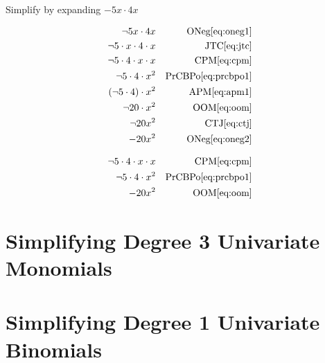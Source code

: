 \documentclass[20150903-160354-rs2.2-MarksMathNotebook.tex]{subfiles}
\begin{document}
\begin{example}[id:20141108-191616] \label{20141108-191616}  \hfill \\

Simplify by expanding $-5x \cdot 4x$

\soln

\solnsteps
\begin{align*}
\neg 5x \cdot 4x && \text{ONeg} \eqref{eq:oneg1} \\
\neg 5 \cdot x \cdot 4 \cdot x && \text{JTC} \eqref{eq:jtc} \\
\neg 5 \cdot 4 \cdot x \cdot x && \text{CPM} \eqref{eq:cpm} \\
\neg 5 \cdot 4 \cdot x^2 && \text{PrCBPo} \eqref{eq:prcbpo1} \\
(\neg 5 \cdot 4) \cdot x^2 && \text{APM} \eqref{eq:apm1} \\
\neg 20 \cdot x^2 && \text{OOM} \eqref{eq:oom} \\
\neg 20 x^2 && \text{CTJ} \eqref{eq:ctj} \\
-20x^2 && \text{ONeg} \eqref{eq:oneg2}
\end{align*}

\soln

\lesssteps
\begin{align*}
\neg 5 \cdot 4 \cdot x \cdot x && \text{CPM} \eqref{eq:cpm} \\
\neg 5 \cdot 4 \cdot x^2 && \text{PrCBPo} \eqref{eq:prcbpo1} \\
-20x^2 && \text{OOM} \eqref{eq:oom}
\end{align*}

\end{example}




\section{Simplifying Degree 3 Univariate Monomials}\label{Simplifying Degree 3 Univariate Monomials}




\section{Simplifying Degree 1 Univariate Binomials}\label{Simplifying Degree 1 Univariate Binomials}
\end{document}
